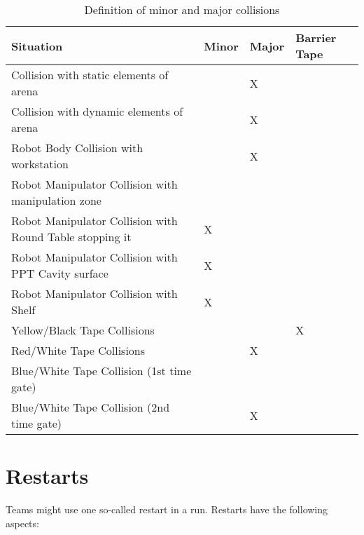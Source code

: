 \begin{table}[h!]
	\caption{Definition of minor and major collisions}
	\label{tab:collisions}
	\centering
  \begin{tabular}{|l|p{1cm}|p{1cm}|p{1.5cm}|}
		\hline
		Situation                                                & Minor & Major & Barrier Tape \\
    \hline
    Collision with static elements of arena                  &       & X     &              \\
    Collision with dynamic elements of arena                 &       & X     &              \\
    Robot Body Collision with workstation                    &       & X     &              \\
    Robot Manipulator Collision with manipulation zone       &       &       &              \\
    Robot Manipulator Collision with Round Table stopping it & X     &       &              \\
    Robot Manipulator Collision with PPT Cavity surface      & X     &       &              \\
    Robot Manipulator Collision with Shelf                   & X     &       &              \\
		Yellow/Black Tape Collisions                             &       &       & X            \\
    Red/White Tape Collisions                                &       & X     &              \\
    Blue/White Tape Collision (1st time gate)                &       &       &              \\
    Blue/White Tape Collision (2nd time gate)                &       & X     &              \\
    \hline
	\end{tabular}
\end{table}

\section{Restarts}
Teams might use one so-called restart in a run. Restarts have the following aspects:

